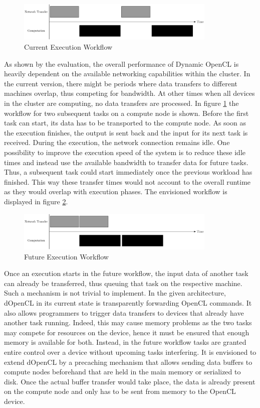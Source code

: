 \begin{figure}[!htb]
	\includegraphics[width=0.85\textwidth]{drawings/missing_queue.pdf}
	\centering
	\caption{Current Execution Workflow}
	\label{img:missing_queuing}
\end{figure}
As shown by the evaluation, the overall performance of Dynamic OpenCL is heavily dependent on the available networking capabilities within the cluster. In the current version, there might be periods where data transfers to different machines overlap, thus competing for bandwidth. At other times when all devices in the cluster are computing, no data transfers are processed. In figure \ref{img:missing_queuing} the workflow for two subsequent tasks on a compute node is shown. Before the first task can start, its data has to be transported to the compute node. As soon as the execution finishes, the output is sent back and the input for its next task is received. During the execution, the network connection remains idle. One possibility to improve the execution speed of the system is to reduce these idle times and instead use the available bandwidth to transfer data for future tasks. Thus, a subsequent task could start immediately once the previous workload has finished. This way these transfer times would not account to the overall runtime as they would overlap with execution phases. The envisioned workflow is displayed in figure \ref{img:active_queueing}.

\begin{figure}[!htb]
	\includegraphics[width=0.85\textwidth]{drawings/active_queue.pdf}
	\centering
	\caption{Future Execution Workflow}
	\label{img:active_queueing}
\end{figure}

Once an execution starts in the future workflow, the input data of another task can already be transferred, thus queuing that task on the respective machine. Such a mechanism is not trivial to implement. In the given architecture, dOpenCL in its current state is transparently forwarding OpenCL commands. It also allows programmers to trigger data transfers to devices that already have another task running. Indeed, this may cause memory problems as the two tasks may compete for resources on the device, hence it must be ensured that enough memory is available for both. Instead, in the future workflow tasks are granted entire control over a device without upcoming tasks interfering. It is envisioned to extend dOpenCL by a precaching mechanism that allows sending data buffers to compute nodes beforehand that are held in the main memory or serialized to disk. Once the actual buffer transfer would take place, the data is already present on the compute node and only has to be sent from memory to the OpenCL device.

